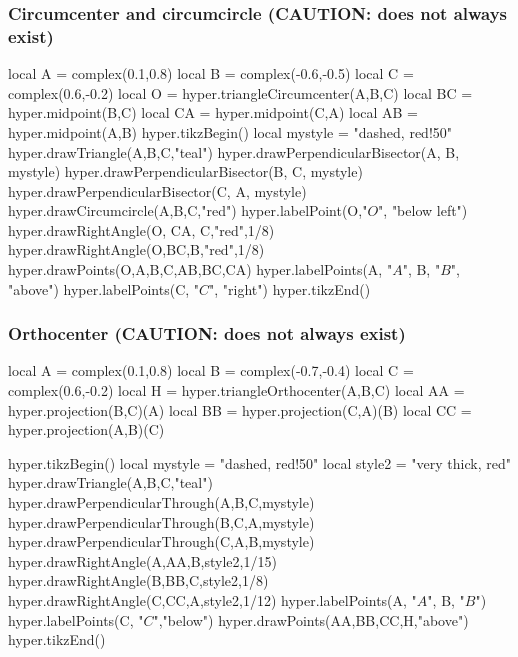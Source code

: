 \documentclass{article}
\begin{document}
\subsubsection{Circumcenter and circumcircle (CAUTION: does not always exist)}
\begin{codeandresult}
\begin{luacode*}
local A = complex(0.1,0.8)
local B = complex(-0.6,-0.5)
local C = complex(0.6,-0.2)
local O = hyper.triangleCircumcenter(A,B,C)
local BC = hyper.midpoint(B,C)
local CA = hyper.midpoint(C,A)
local AB = hyper.midpoint(A,B)
hyper.tikzBegin()
local mystyle = "dashed, red!50"
hyper.drawTriangle(A,B,C,"teal")
hyper.drawPerpendicularBisector(A, B, mystyle)
hyper.drawPerpendicularBisector(B, C, mystyle)
hyper.drawPerpendicularBisector(C, A, mystyle)
hyper.drawCircumcircle(A,B,C,"red")
hyper.labelPoint(O,"$O$", "below left")
hyper.drawRightAngle(O, CA, C,"red",1/8)
hyper.drawRightAngle(O,BC,B,"red",1/8)
hyper.drawPoints(O,A,B,C,AB,BC,CA)
hyper.labelPoints(A, "$A$", B, "$B$", "above")
hyper.labelPoints(C, "$C$", "right")
hyper.tikzEnd()
\end{luacode*}
\end{codeandresult}


\subsubsection{Orthocenter (CAUTION: does not always exist)}
\begin{codeandresult}
\begin{luacode*}
local A = complex(0.1,0.8)
local B = complex(-0.7,-0.4)
local C = complex(0.6,-0.2)
local H = hyper.triangleOrthocenter(A,B,C)
local AA = hyper.projection(B,C)(A)
local BB = hyper.projection(C,A)(B)
local CC = hyper.projection(A,B)(C)

hyper.tikzBegin()
local mystyle = "dashed, red!50"
local style2 = "very thick, red"
hyper.drawTriangle(A,B,C,"teal")
hyper.drawPerpendicularThrough(A,B,C,mystyle)
hyper.drawPerpendicularThrough(B,C,A,mystyle)
hyper.drawPerpendicularThrough(C,A,B,mystyle)
hyper.drawRightAngle(A,AA,B,style2,1/15)
hyper.drawRightAngle(B,BB,C,style2,1/8)
hyper.drawRightAngle(C,CC,A,style2,1/12)
hyper.labelPoints(A, "$A$", B, "$B$")
hyper.labelPoints(C, "$C$","below")
hyper.drawPoints(AA,BB,CC,H,"above")
hyper.tikzEnd()
\end{luacode*}
\end{codeandresult}
\end{document}
